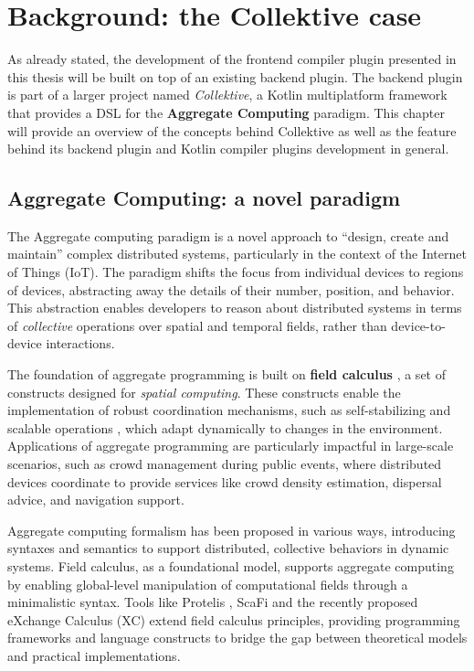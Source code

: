 \documentclass[12pt,a4paper,openright,twoside]{book}
\begin{document}
\chapter{Background: the Collektive case}
\label{chap:background}

As already stated, the development of the frontend compiler plugin presented in
this thesis will be built on top of an existing backend plugin. The backend
plugin is part of a larger project named \emph{Collektive}, a Kotlin
multiplatform framework that provides a \ac{DSL} for the \textbf{Aggregate
Computing} \cite{Beal2015} paradigm. This chapter will provide an overview of
the concepts behind Collektive as well as the feature behind its backend plugin
and Kotlin compiler plugins development in general.

\section{Aggregate Computing: a novel paradigm}

The Aggregate computing paradigm is a novel approach to ``design, create and
maintain'' \cite{Beal2015} complex distributed systems, particularly in the 
context of the Internet of Things (IoT). The paradigm shifts the focus from
individual devices to regions of devices, abstracting away the details of their
number, position, and behavior. This abstraction enables developers to reason
about distributed systems in terms of \emph{collective} operations over spatial and
temporal fields, rather than device-to-device interactions. 

The foundation of aggregate programming is built on \textbf{field calculus}
\cite{Beal2014TowardsAU}, a set of constructs designed for \emph{spatial
computing}. These constructs enable the implementation of robust coordination
mechanisms, such as self-stabilizing and scalable operations \cite{Viroli2018}
\cite{DBLP:journals/jlap/ViroliBDACP19}, which adapt dynamically to changes in
the environment. Applications of aggregate programming are particularly
impactful in large-scale scenarios, such as crowd management during public
events, where distributed devices coordinate to provide services like crowd
density estimation, dispersal advice, and navigation support.

Aggregate computing formalism has been proposed in various ways, introducing
syntaxes and semantics to support distributed, collective behaviors in dynamic
systems. Field calculus, as a foundational model, supports aggregate computing
by enabling global-level manipulation of computational fields through a
minimalistic syntax. 
%
Tools like Protelis \cite{DBLP:conf/saso/PianiniBV17}, ScaFi
\cite{DBLP:conf/ecoop/CasadeiV16} and the recently proposed eXchange Calculus
(XC) \cite{DBLP:journals/jss/AudritoCDSV24} extend field calculus principles,
providing programming frameworks and language constructs to bridge the gap
between theoretical models and practical implementations.
\end{document}
